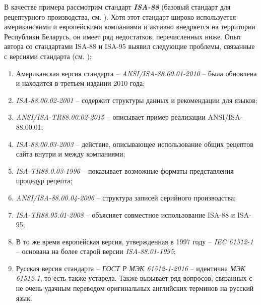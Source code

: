 В качестве примера рассмотрим стандарт \textbf{\textit{ISA-88}} (базовый стандарт для рецептурного производства, см. ). Хотя этот стандарт широко используется американскими и европейскими компаниями и активно внедряется на территории Республики Беларусь, он имеет ряд недостатков, перечисленных ниже. Опыт автора со стандартами ISA-88 и ISA-95 выявил следующие проблемы, связанные с версиями стандарта (см. ):
\begin{enumerate}
    \item Американская версия стандарта -- \textit{ANSI/ISA-88.00.01-2010} -- была обновлена и находится в третьем издании 2010 года;
    \item \textit{ISA-88.00.02-2001} – содержит структуры данных и рекомендации для языков;
    \item \textit{ANSI/ISA-TR88.00.02-2015} -- описывает пример реализации ANSI/ISA-88.00.01;
    \item \textit{ISA-88.00.03-2003} -- действие, описывающее использование общих рецептов сайта внутри и между компаниями;
    \item \textit{ISA-TR88.0.03-1996} -- показывает возможные форматы представления процедур рецепта;
    \item \textit{ANSI/ISA-88.00.04-2006} -- структура записей серийного производства;
    \item \textit{ISA-TR88.95.01-2008} -- объясняет совместное использование ISA-88 и ISA-95;
    \item В то же время европейская версия, утвержденная в 1997 году -- \textit{IEC 61512-1} -- основана на более старой версии \textit{ISA-88.01-1995};
    \item Русская версия стандарта -- \textit{ГОСТ Р МЭК 61512-1-2016} -- идентична \textit{МЭК 61512-1}, то есть также устарела. Также вызывает ряд вопросов, связанных с не очень удачным переводом оригинальных английских терминов на русский язык.
\end{enumerate}

